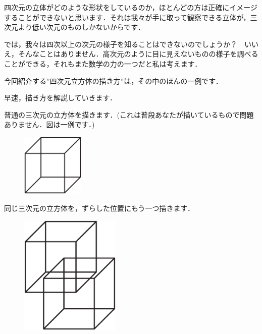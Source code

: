 \documentclass[./main]{subfiles} %
\begin{document}


四次元の立体がどのような形状をしているのか，ほとんどの方は正確にイメージすることができないと思います．それは我々が手に取って観察できる立体が，三次元より低い次元のものしかないからです．

では，我々は四次以上の次元の様子を知ることはできないのでしょうか？　いいえ，そんなことはありません．高次元のように目に見えないものの様子を調べることができる，それもまた数学の力の一つだと私は考えます．

今回紹介する''四次元立方体の描き方''は，その中のほんの一例です．

早速，描き方を解説していきます．


普通の三次元の立方体を描きます．(これは普段あなたが描いているもので問題ありません．図は一例です．)

\begin{figure}[h]
\begin{center}
\includegraphics[width=30mm]{mask_rittai1.eps}
\end{center}
\end{figure}


同じ三次元の立方体を，ずらした位置にもう一つ描きます．

\begin{figure}[h]
\begin{center}
\includegraphics[width=48mm]{mask_rittai2.eps}
\end{center}
\end{figure}
\end{document}
